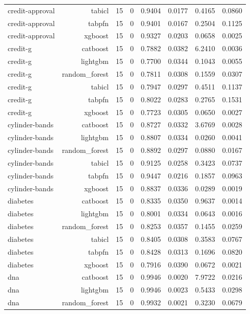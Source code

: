 \begin{table}[htbp]
\begin{tabular}{lrrrrrrr}
credit-approval & tabicl & 15 & 0 & 0.9404 & 0.0177 & 0.4165 & 0.0860 \\
credit-approval & tabpfn & 15 & 0 & 0.9401 & 0.0167 & 0.2504 & 0.1125 \\
credit-approval & xgboost & 15 & 0 & 0.9327 & 0.0203 & 0.0658 & 0.0025 \\
credit-g & catboost & 15 & 0 & 0.7882 & 0.0382 & 6.2410 & 0.0036 \\
credit-g & lightgbm & 15 & 0 & 0.7700 & 0.0344 & 0.1043 & 0.0055 \\
credit-g & random\_forest & 15 & 0 & 0.7811 & 0.0308 & 0.1559 & 0.0307 \\
credit-g & tabicl & 15 & 0 & 0.7947 & 0.0297 & 0.4511 & 0.1137 \\
credit-g & tabpfn & 15 & 0 & 0.8022 & 0.0283 & 0.2765 & 0.1531 \\
credit-g & xgboost & 15 & 0 & 0.7723 & 0.0305 & 0.0650 & 0.0027 \\
cylinder-bands & catboost & 15 & 0 & 0.8727 & 0.0332 & 3.6769 & 0.0028 \\
cylinder-bands & lightgbm & 15 & 0 & 0.8807 & 0.0334 & 0.0260 & 0.0041 \\
cylinder-bands & random\_forest & 15 & 0 & 0.8892 & 0.0297 & 0.0880 & 0.0167 \\
cylinder-bands & tabicl & 15 & 0 & 0.9125 & 0.0258 & 0.3423 & 0.0737 \\
cylinder-bands & tabpfn & 15 & 0 & 0.9447 & 0.0216 & 0.1857 & 0.0963 \\
cylinder-bands & xgboost & 15 & 0 & 0.8837 & 0.0336 & 0.0289 & 0.0019 \\
diabetes & catboost & 15 & 0 & 0.8335 & 0.0350 & 0.9637 & 0.0014 \\
diabetes & lightgbm & 15 & 0 & 0.8001 & 0.0334 & 0.0643 & 0.0016 \\
diabetes & random\_forest & 15 & 0 & 0.8253 & 0.0357 & 0.1455 & 0.0259 \\
diabetes & tabicl & 15 & 0 & 0.8405 & 0.0308 & 0.3583 & 0.0767 \\
diabetes & tabpfn & 15 & 0 & 0.8428 & 0.0313 & 0.1696 & 0.0820 \\
diabetes & xgboost & 15 & 0 & 0.7916 & 0.0390 & 0.0672 & 0.0021 \\
dna & catboost & 15 & 0 & 0.9946 & 0.0020 & 7.9722 & 0.0216 \\
dna & lightgbm & 15 & 0 & 0.9946 & 0.0023 & 0.5433 & 0.0298 \\
dna & random\_forest & 15 & 0 & 0.9932 & 0.0021 & 0.3230 & 0.0679 \\

\end{tabular}
\end{table}
